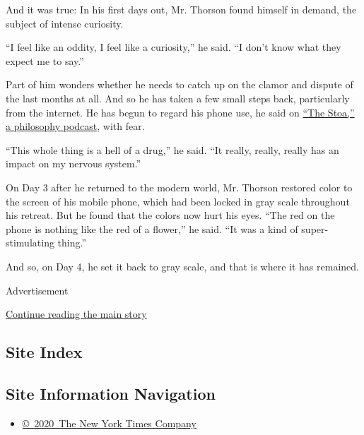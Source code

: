 And it was true: In his first days out, Mr. Thorson found himself in
demand, the subject of intense curiosity.

``I feel like an oddity, I feel like a curiosity,'' he said. ``I don't
know what they expect me to say.''

Part of him wonders whether he needs to catch up on the clamor and
dispute of the last months at all. And so he has taken a few small steps
back, particularly from the internet. He has begun to regard his phone
use, he said on \href{https://www.thestoa.ca/}{``The Stoa,'' a
philosophy podcast}, with fear.

``This whole thing is a hell of a drug,'' he said. ``It really, really,
really has an impact on my nervous system.''

On Day 3 after he returned to the modern world, Mr. Thorson restored
color to the screen of his mobile phone, which had been locked in gray
scale throughout his retreat. But he found that the colors now hurt his
eyes. ``The red on the phone is nothing like the red of a flower,'' he
said. ``It was a kind of super-stimulating thing.''

And so, on Day 4, he set it back to gray scale, and that is where it has
remained.

Advertisement

\protect\hyperlink{after-bottom}{Continue reading the main story}

\hypertarget{site-index}{%
\subsection{Site Index}\label{site-index}}

\hypertarget{site-information-navigation}{%
\subsection{Site Information
Navigation}\label{site-information-navigation}}

\begin{itemize}
\tightlist
\item
  \href{https://help.nytimes.com/hc/en-us/articles/115014792127-Copyright-notice}{©~2020~The
  New York Times Company}
\end{itemize}

